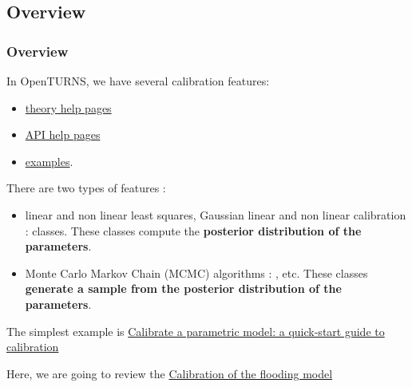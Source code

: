 \documentclass[9pt]{beamer}
\begin{document}
\begin{frame}[fragile]
\section{Overview}
\frametitle{Overview}

In OpenTURNS, we have several calibration features:
\begin{itemize}
\item \href{https://openturns.github.io/openturns/latest/theory/data_analysis/data_analysis.html#calibration}{theory help pages}
\item \href{https://openturns.github.io/openturns/latest/user_manual/calibration.html}{API help pages}
\item \href{https://openturns.github.io/openturns/latest/auto_calibration/index.html}{examples}.
\end{itemize}


There are two types of features :
\begin{itemize}
\item linear and non linear least squares, Gaussian linear and non linear calibration :  classes. These classes compute the \textbf{posterior distribution of the parameters}.
\item Monte Carlo Markov Chain (MCMC) algorithms : , etc. These classes \textbf{generate a sample from the posterior distribution of the parameters}.
\end{itemize}

The simplest example is \href{https://openturns.github.io/openturns/latest/auto_calibration/least_squares_and_gaussian_calibration/plot_calibration_quickstart.html#sphx-glr-auto-calibration-least-squares-and-gaussian-calibration-plot-calibration-quickstart-py}{Calibrate a parametric model: a quick-start guide to calibration}

Here, we are going to review the \href{https://openturns.github.io/openturns/latest/auto_calibration/least_squares_and_gaussian_calibration/plot_calibration_flooding.html#sphx-glr-auto-calibration-least-squares-and-gaussian-calibration-plot-calibration-flooding-py}{Calibration of the flooding model}
\end{frame}


\end{document}
